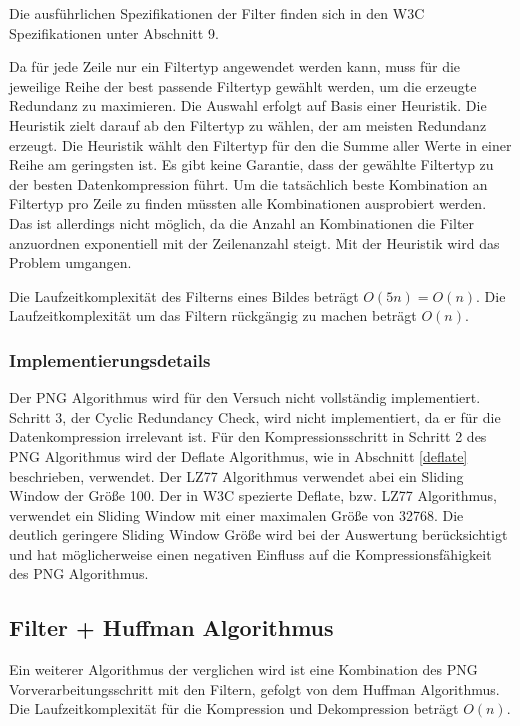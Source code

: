 \documentclass[conference]{IEEEtran}
\begin{document}
Die ausführlichen Spezifikationen der Filter finden sich in den W3C Spezifikationen \cite{w3c} unter
Abschnitt 9.

Da für jede Zeile nur ein Filtertyp angewendet werden kann, muss für die jeweilige
Reihe der best passende Filtertyp gewählt werden, um die erzeugte Redundanz zu maximieren.
Die Auswahl erfolgt auf Basis einer Heuristik.
Die Heuristik zielt darauf ab den Filtertyp zu wählen, der am meisten Redundanz erzeugt.
Die Heuristik wählt den Filtertyp für den die Summe aller Werte in einer Reihe
am geringsten ist.
Es gibt keine Garantie, dass der gewählte Filtertyp zu der besten Datenkompression
führt.
Um die tatsächlich beste Kombination an Filtertyp pro Zeile zu finden müssten alle
Kombinationen ausprobiert werden.
Das ist allerdings nicht möglich, da die Anzahl an Kombinationen die Filter
anzuordnen exponentiell mit der Zeilenanzahl steigt.
Mit der Heuristik wird das Problem umgangen.

Die Laufzeitkomplexität des Filterns eines Bildes beträgt $O(5n) = O(n)$.
Die Laufzeitkomplexität um das Filtern rückgängig zu machen beträgt $O(n)$.
\cite{nick}


\subsubsection{Implementierungsdetails}

Der PNG Algorithmus wird für den Versuch nicht vollständig implementiert.
Schritt 3, der Cyclic Redundancy Check, wird nicht implementiert, da
er für die Datenkompression irrelevant ist.
Für den Kompressionsschritt in Schritt 2 des PNG Algorithmus wird der Deflate
Algorithmus, wie in Abschnitt \ref{deflate} beschrieben, verwendet.
Der LZ77 Algorithmus verwendet abei ein Sliding Window der Größe 100.
Der in W3C spezierte Deflate, bzw. LZ77 Algorithmus, verwendet ein Sliding Window
mit einer maximalen Größe von 32768. \cite{w3c}
Die deutlich geringere Sliding Window Größe wird bei der Auswertung berücksichtigt
und hat möglicherweise einen negativen Einfluss auf die Kompressionsfähigkeit
des PNG Algorithmus.

\subsection{Filter + Huffman Algorithmus}

Ein weiterer Algorithmus der verglichen wird ist eine Kombination des PNG
Vorverarbeitungsschritt mit den Filtern, gefolgt von dem Huffman Algorithmus.
Die Laufzeitkomplexität für die Kompression und Dekompression beträgt
$O(n)$.
\end{document}
